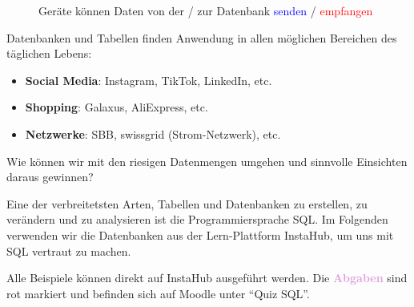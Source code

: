 \begin{figure}[H]
  \centering
  \caption{Geräte können Daten von der / zur Datenbank	 \textcolor{blue}{senden} / \textcolor{red}{empfangen}}
  \label{fig:db-schema}
\end{figure}

Datenbanken und Tabellen finden Anwendung in allen möglichen Bereichen des täglichen Lebens:
\begin{itemize}
  \item \textbf{Social Media}: Instagram, TikTok, LinkedIn, etc.
  \item \textbf{Shopping}: Galaxus, AliExpress, etc.
  \item \textbf{Netzwerke}: SBB, swissgrid (Strom-Netzwerk), etc.
\end{itemize}

Wie können wir mit den riesigen Datenmengen umgehen und sinnvolle Einsichten daraus gewinnen?

Eine der verbreitetsten Arten, Tabellen und Datenbanken zu erstellen, zu verändern und zu analysieren ist die Programmiersprache \gls{SQL}. Im Folgenden verwenden wir die Datenbanken aus der Lern-Plattform InstaHub, um uns mit \gls{SQL}  vertraut zu machen.

Alle Beispiele können direkt auf InstaHub ausgeführt werden. Die \textcolor{Plum}{\textbf{Abgaben}} sind rot markiert
und befinden sich auf Moodle unter \enquote{Quiz \gls{SQL}}.


